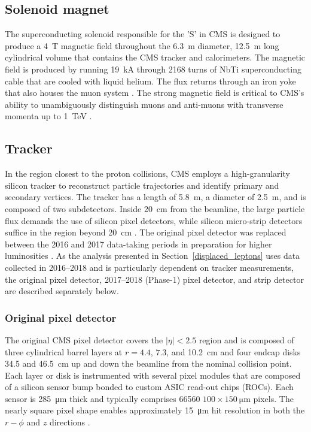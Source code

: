 \subsection{Solenoid magnet}
The superconducting solenoid responsible for the 'S' in CMS is designed to produce a \SI{4}{\tesla} magnetic field throughout the \SI{6.3}{\metre} diameter, \SI{12.5}{\metre} long cylindrical volume  that contains the CMS tracker and calorimeters. The magnetic field is produced by running \SI{19}{\kA} through 2168 turns of NbTi superconducting cable that are cooled with liquid helium. The flux returns through an iron yoke that also houses the muon system \cite{cms_experiment}. The strong magnetic field is critical to CMS's ability to unambiguously distinguish muons and anti-muons with transverse momenta up to \SI{1}{\TeV} \cite{cms_tdr_v1}.

\subsection{Tracker}
\label{tracker}
In the region closest to the proton collisions, CMS employs a high-granularity silicon tracker to reconstruct particle trajectories and identify primary and secondary vertices. The tracker has a length of \SI{5.8}{\m}, a diameter of \SI{2.5}{\m}, and is composed of two subdetectors. Inside \SI{20}{\cm} from the beamline, the large particle flux demands the use of silicon pixel detectors, while silicon micro-strip detectors suffice in the region beyond \SI{20}{\cm} \cite{cms_experiment}. The original pixel detector was replaced between the 2016 and 2017 data-taking periods in preparation for higher luminosities \cite{cms_phase1_pixels}. As the analysis presented in Section~\ref{displaced_leptons} uses data collected in 2016--2018 and is particularly dependent on tracker measurements, the original pixel detector, 2017--2018 (Phase-1) pixel detector, and strip detector are described separately below. 


\subsubsection{Original pixel detector}
The original CMS pixel detector covers the $|\eta|<2.5$ region and is composed of three cylindrical barrel layers at $r=4.4$, $7.3$, and \SI{10.2}{\cm} and four endcap disks \num{34.5} and \SI{46.5}{\cm} up and down the beamline from the nominal collision point. Each layer or disk is instrumented with several pixel modules that are composed of a silicon sensor bump bonded to custom ASIC read-out chips (ROCs). Each sensor is \SI{285}{\um} thick and typically comprises 66560 $100\times\SI{150}{\um}$ pixels. The nearly square pixel shape enables approximately \SI{15}{\um} hit resolution in both the $r-\phi$ and $z$ directions \cite{cms_tdr_v1, cms_experiment}.

